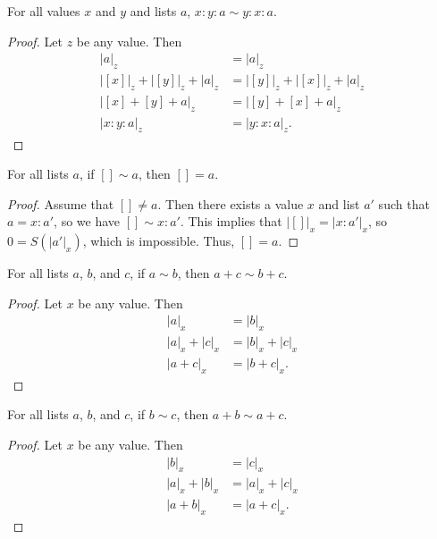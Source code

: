 \documentclass[../../math.tex]{subfiles}
\begin{document}
\begin{theorem} \label{list_perm_swap}
    For all values $x$ and $y$ and lists $a$, $x : y : a \sim y : x : a$.
\end{theorem}
\begin{proof}
    Let $z$ be any value.  Then
    \begin{align*}
        |a|_z &= |a|_z \\
        |[x]|_z + |[y]|_z + |a|_z &= |[y]|_z + |[x]|_z + |a|_z \\
        |[x] + [y] + a|_z &= |[y] + [x] + a|_z \\
        |x : y : a|_z &= |y : x : a|_z.
    \end{align*}
\end{proof}

\begin{theorem} \label{list_perm_nil_eq}
    For all lists $a$, if $[] \sim a$, then $[] = a$.
\end{theorem}
\begin{proof}
    Assume that $[] \neq a$.  Then there exists a value $x$ and list $a'$ such
    that $a = x : a'$, so we have $[] \sim x : a'$.  This implies that $|[]|_x =
    |x : a'|_x$, so $0 = S(|a'|_x)$, which is impossible.  Thus, $[] = a$.
\end{proof}

\begin{theorem} \label{list_perm_lpart}
    For all lists $a$, $b$, and $c$, if $a \sim b$, then $a + c \sim b + c$.
\end{theorem}
\begin{proof}
    Let $x$ be any value.  Then
    \begin{align*}
        |a|_x &= |b|_x \\
        |a|_x + |c|_x &= |b|_x + |c|_x \\
        |a + c|_x &= |b + c|_x.
    \end{align*}
\end{proof}

\begin{theorem} \label{list_perm_rpart}
    For all lists $a$, $b$, and $c$, if $b \sim c$, then $a + b \sim a + c$.
\end{theorem}
\begin{proof}
    Let $x$ be any value.  Then
    \begin{align*}
        |b|_x &= |c|_x \\
        |a|_x + |b|_x &= |a|_x + |c|_x \\
        |a + b|_x &= |a + c|_x.
    \end{align*}
\end{proof}
\end{document}
